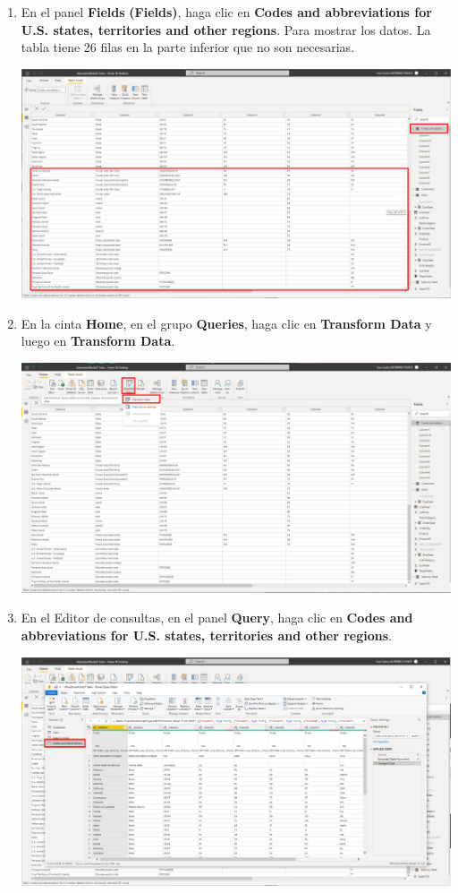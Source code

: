 \documentclass[12pt,letterpaper]{article}
\newcommand\tab[1][1cm]{\hspace*{#1}}
\begin{document}
\begin{enumerate}[\tab 1.]
\begin{center}
        \end{center}
        \item En el panel \textbf{Fields} \textbf{(Fields)}, haga clic en \textbf{Codes and abbreviations for U.S. states, territories and other regions}. Para mostrar los datos. La tabla tiene 26 filas en la parte inferior que no son necesarias.
        \begin{center}
            \includegraphics[width=13cm]{./img/img56.png}
        \end{center}
        \item En la cinta \textbf{Home}, en el grupo \textbf{Queries}, haga clic en \textbf{Transform Data} y luego en \textbf{Transform Data}.
        \begin{center}
            \includegraphics[width=13cm]{./img/img57.png}
        \end{center}
        \item En el Editor de consultas, en el panel \textbf{Query}, haga clic en \textbf{Codes and abbreviations for U.S. states, territories and other regions}.
        \begin{center}
            \includegraphics[width=13cm]{./img/img58.png}

\end{center}
\end{enumerate}
\end{document}
